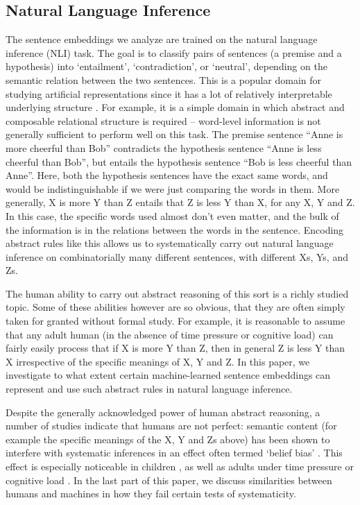 \subsection{Natural Language Inference}
The sentence embeddings we analyze are trained on the natural language inference (NLI) task. The goal is to classify pairs of sentences (a premise and a hypothesis) into `entailment', `contradiction', or `neutral', depending on the semantic relation between the two sentences. This is a popular domain for studying artificial representations since it has a lot of relatively interpretable underlying structure \citep{glockner2018breaking, mccoy2019right, nie2019analyzing}. For example, it is a simple domain in which abstract and composable relational structure is required -- word-level information is not generally sufficient to perform well on this task. The premise sentence ``Anne is more cheerful than Bob'' contradicts the hypothesis sentence ``Anne is less cheerful than Bob'', but entails the hypothesis sentence ``Bob is less cheerful than Anne''. Here, both the hypothesis sentences have the exact same words, and would be indistinguishable if we were just comparing the words in them. More generally, X is more Y than Z entails that Z is less Y than X, for any X, Y and Z. In this case, the specific words used almost don't even matter, and the bulk of the information is in the relations between the words in the sentence. Encoding abstract rules like this allows us to systematically carry out natural language inference on combinatorially many different sentences, with different Xs, Ys, and Zs.

The human ability to carry out abstract reasoning of this sort is a richly studied topic. Some of these abilities however are so obvious, that they are often simply taken for granted without formal study. For example, it is reasonable to assume that any adult human (in the absence of time pressure or cognitive load) can fairly easily process that if X is more Y than Z, then in general Z is less Y than X irrespective of the specific meanings of X, Y and Z. In this paper, we investigate to what extent certain machine-learned sentence embeddings can represent and use such abstract rules in natural language inference.

Despite the generally acknowledged power of human abstract reasoning, a number of studies indicate that humans are not perfect: semantic content (for example the specific meanings of the X, Y and Zs above) has been shown to interfere with systematic inferences in an effect often termed `belief bias' \citep{braine1978relation,johnson1978psychology}. This effect is especially noticeable in children \citep{evans1995belief}, as well as adults under time pressure or cognitive load \citep{evans2013psychology}. In the last part of this paper, we discuss similarities between humans and machines in how they fail certain tests of systematicity.

